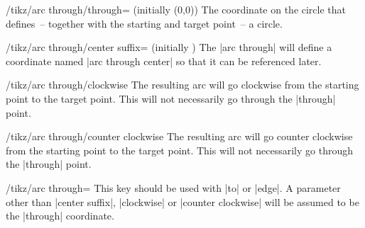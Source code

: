 \begin{multicols}{2}
\begin{key}{/tikz/arc through/through= (initially {(0,0)})}
  The coordinate on the circle that defines~-- together with the
  starting and target point~-- a circle.
\end{key}

\begin{key}{/tikz/arc through/center suffix= (initially {})}
  The |arc through| will define a coordinate named |arc through center|
  so that it can be referenced later.
\end{key}

\begin{key}{/tikz/arc through/clockwise}
  The resulting arc will go clockwise from the starting point to the target point.
  This will not necessarily go through the |through| point.
\end{key}

\begin{key}{/tikz/arc through/counter clockwise}
  The resulting arc will go counter clockwise from the starting point to the target point.
  This will not necessarily go through the |through| point.
\end{key}

\begin{key}{/tikz/arc through=}
  This key should be used with |to| or |edge|.
  A parameter other than |center suffix|, |clockwise| or |counter clockwise| will
  be assumed to be the |through| coordinate.
\end{key}
\end{multicols}
\endinput